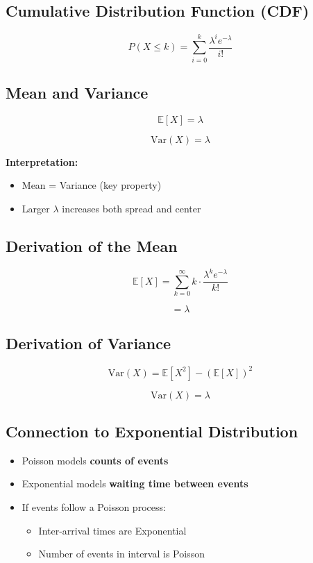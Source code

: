 \documentclass[10pt,a4paper]{article}
\begin{document}
\subsection{Cumulative Distribution Function (CDF)}

\[
P(X \le k) = \sum_{i=0}^{k} \frac{\lambda^i e^{-\lambda}}{i!}
\]


\subsection{Mean and Variance}

\[
\mathbb{E}[X] = \lambda
\]

\[
\mathrm{Var}(X) = \lambda
\]

\textbf{Interpretation:}
\begin{itemize}
 \item Mean = Variance (key property)
 \item Larger $\lambda$ increases both spread and center
\end{itemize}


\subsection{Derivation of the Mean}

\[
\mathbb{E}[X] = \sum_{k=0}^{\infty} k \cdot \frac{\lambda^k e^{-\lambda}}{k!}
\]

\[
= \lambda
\]


\subsection{Derivation of Variance}

\[
\mathrm{Var}(X) = \mathbb{E}[X^2] - (\mathbb{E}[X])^2
\]

\[
\mathrm{Var}(X) = \lambda
\]


\subsection{Connection to Exponential Distribution}

\begin{itemize}
 \item Poisson models \textbf{counts of events}
 \item Exponential models \textbf{waiting time between events}
 \item If events follow a Poisson process:
 \begin{itemize}
     \item Inter-arrival times are Exponential
     \item Number of events in interval is Poisson
 \end{itemize}
\end{itemize}
\end{document}
